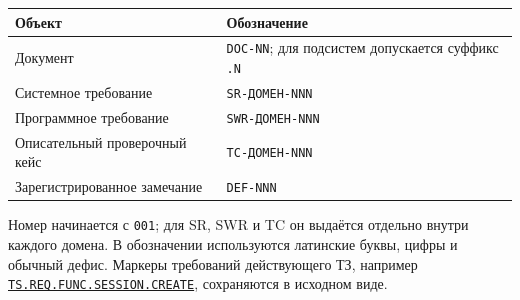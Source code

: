 \documentclass[12pt,a4paper]{article}
\begin{document}
{\def\LTcaptype{none} %
\begin{longtable}[]{@{}
  >{\raggedright\arraybackslash}p{}
  >{\raggedright\arraybackslash}p{}@{}}
\toprule\noalign{}
\begin{minipage}[b]{\linewidth}\raggedright
Объект
\end{minipage} & \begin{minipage}[b]{\linewidth}\raggedright
Обозначение
\end{minipage} \\
\midrule\noalign{}
\endhead
\bottomrule\noalign{}
\endlastfoot
Документ & \texttt{DOC-NN}; для подсистем допускается суффикс \texttt{.N} \\
Системное требование & \texttt{SR-\allowbreak{}ДОМЕН-\allowbreak{}NNN} \\
Программное требование & \texttt{SWR-\allowbreak{}ДОМЕН-\allowbreak{}NNN} \\
Описательный проверочный кейс & \texttt{TC-\allowbreak{}ДОМЕН-\allowbreak{}NNN} \\
Зарегистрированное замечание & \texttt{DEF-NNN} \\
\end{longtable}
}

Номер начинается с \texttt{001}; для SR, SWR и TC он выдаётся отдельно внутри каждого домена. В обозначении используются латинские буквы, цифры и обычный дефис. Маркеры требований действующего ТЗ, например {\href{../02\_Техническое\_задание/DOC-02\_Техническое\_задание.pdf\#ts-req-func-session-create}{\texttt{TS.\allowbreak{}REQ.\allowbreak{}FUNC.\allowbreak{}SESSION.\allowbreak{}CREATE}}}, сохраняются в исходном виде.
\end{document}
